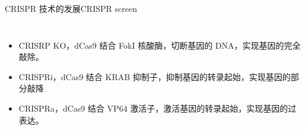\documentclass{beamer}
\begin{document}
\begin{frame}{CRISPR 技术的发展}{CRISPR screen}
\begin{columns}

		
		\begin{itemize}
			\item CRISRP KO，dCas9 结合 FokI 核酸酶，切断基因的 DNA，实现基因的完全敲除。
			\item CRISPRi，dCas9 结合 KRAB 抑制子，抑制基因的转录起始，实现基因的部分敲降
			\item CRISPRa，dCas9 结合 VP64 激活子，激活基因的转录起始，实现基因的过表达。
		\end{itemize}
		
		

	\end{columns}

	

\end{frame}

\end{document}
